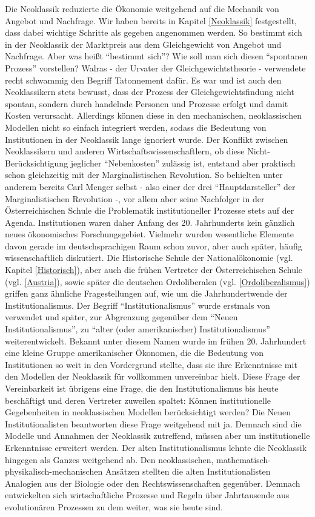 Die Neoklassik reduzierte die Ökonomie weitgehend auf die Mechanik von Angebot und Nachfrage. Wir haben bereits in Kapitel \ref{Neoklassik} festgestellt, dass dabei wichtige Schritte als gegeben angenommen werden. So bestimmt sich in der Neoklassik der Marktpreis aus dem Gleichgewicht von Angebot und Nachfrage. Aber was heißt "`bestimmt sich"'? Wie soll man sich diesen "`spontanen Prozess"' vorstellen? Walras - der Urvater der Gleichgewichtstheorie - verwendete recht schwammig den Begriff Tatonnement dafür. Es war und ist auch den Neoklassikern stets bewusst, dass der Prozess der Gleichgewichtsfindung nicht spontan, sondern durch handelnde Personen und Prozesse erfolgt und damit Kosten verursacht. Allerdings können diese in den mechanischen, neoklassischen Modellen nicht so einfach integriert werden, sodass die Bedeutung von Institutionen in der Neoklassik lange ignoriert wurde. Der Konflikt zwischen Neoklassikern und anderen Wirtschaftswissenschaftlern, ob diese Nicht-Berücksichtigung jeglicher "`Nebenkosten"' zulässig ist, entstand aber praktisch schon gleichzeitig mit der Marginalistischen Revolution. So behielten unter anderem bereits Carl Menger selbst - also einer der drei "`Hauptdarsteller"' der Marginalistischen Revolution -, vor allem aber seine Nachfolger in der Österreichischen Schule die Problematik institutioneller Prozesse stets auf der Agenda. Institutionen waren daher Anfang des 20. Jahrhunderts kein gänzlich neues ökonomisches Forschungsgebiet. Vielmehr wurden wesentliche Elemente davon gerade im deutschsprachigen Raum schon zuvor, aber auch später, häufig wissenschaftlich diskutiert. Die Historische Schule der Nationalökonomie (vgl. Kapitel \ref{Historisch}), aber auch die frühen Vertreter der Österreichischen Schule (vgl. \ref{Austria}), sowie später die deutschen Ordoliberalen (vgl. \ref{Ordoliberalismus}) griffen ganz ähnliche Fragestellungen auf, wie um die Jahrhundertwende der Institutionalismus. Der Begriff "`Institutionalismus"' wurde erstmals von \textcite{Hamilton1919} verwendet und später, zur Abgrenzung gegenüber dem "`Neuen Institutionalismus"', zu "`alter (oder amerikanischer) Institutionalismus"' weiterentwickelt. Bekannt unter diesem Namen wurde im frühen 20. Jahrhundert eine kleine Gruppe amerikanischer Ökonomen, die die Bedeutung von Institutionen so weit in den Vordergrund stellte, dass sie ihre Erkenntnisse mit den Modellen der Neoklassik für vollkommen unvereinbar hielt. Diese Frage der Vereinbarkeit ist übrigens eine Frage, die den Institutionalismus bis heute beschäftigt und deren Vertreter zuweilen spaltet: Können institutionelle Gegebenheiten in neoklassischen Modellen berücksichtigt werden? Die Neuen Institutionalisten beantworten diese Frage weitgehend mit ja. Demnach sind die Modelle und Annahmen der Neoklassik zutreffend, müssen aber um institutionelle Erkenntnisse erweitert werden. Der alten Institutionalismus lehnte die Neoklassik hingegen als Ganzes weitgehend ab. Den neoklassischen, mathematisch-physikalisch-mechanischen Ansätzen stellten die alten Institutionalisten Analogien aus der Biologie oder den Rechtswissenschaften gegenüber. Demnach entwickelten sich wirtschaftliche Prozesse und Regeln über Jahrtausende aus evolutionären Prozessen zu dem weiter, was sie heute sind. 

